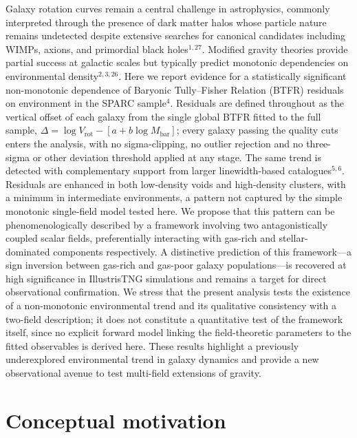 \documentclass[11pt,a4paper]{article}
\begin{document}
Galaxy rotation curves remain a central challenge in astrophysics, commonly interpreted through the presence of dark matter halos whose particle nature remains undetected despite extensive searches for canonical candidates including WIMPs, axions, and primordial black holes$^{1,27}$. Modified gravity theories provide partial success at galactic scales but typically predict monotonic dependencies on environmental density$^{2,3,26}$. Here we report evidence for a statistically significant non-monotonic dependence of Baryonic Tully--Fisher Relation (BTFR) residuals on environment in the SPARC sample$^{4}$. Residuals are defined throughout as the vertical offset of each galaxy from the single global BTFR fitted to the full sample, $\Delta = \log V_{\mathrm{rot}} - [a + b \log M_{\mathrm{bar}}]$; every galaxy passing the quality cuts enters the analysis, with no sigma-clipping, no outlier rejection and no three-sigma or other deviation threshold applied at any stage. The same trend is detected with complementary support from larger linewidth-based catalogues$^{5,6}$. Residuals are enhanced in both low-density voids and high-density clusters, with a minimum in intermediate environments, a pattern not captured by the simple monotonic single-field model tested here. We propose that this pattern can be phenomenologically described by a framework involving two antagonistically coupled scalar fields, preferentially interacting with gas-rich and stellar-dominated components respectively. A distinctive prediction of this framework---a sign inversion between gas-rich and gas-poor galaxy populations---is recovered at high significance in IllustrisTNG simulations and remains a target for direct observational confirmation. We stress that the present analysis tests the existence of a non-monotonic environmental trend and its qualitative consistency with a two-field description; it does not constitute a quantitative test of the framework itself, since no explicit forward model linking the field-theoretic parameters to the fitted observables is derived here. These results highlight a previously underexplored environmental trend in galaxy dynamics and provide a new observational avenue to test multi-field extensions of gravity.


\section*{Conceptual motivation}
\end{document}
